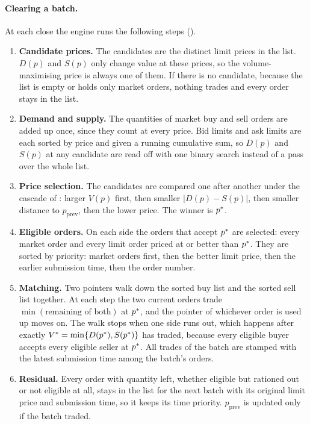 \paragraph{Clearing a batch.} At each close the engine runs the following
steps ().
\begin{enumerate}
  \item \textbf{Candidate prices.} The candidates are the distinct limit
  prices in the list. $D(p)$ and $S(p)$ only change value at these prices,
  so the volume-maximising price is always one of them. If there is no
  candidate, because the list is empty or holds only market orders, nothing
  trades and every order stays in the list.
  \item \textbf{Demand and supply.} The quantities of market buy and sell
  orders are added up once, since they count at every price. Bid limits and
  ask limits are each sorted by price and given a running cumulative sum,
  so $D(p)$ and $S(p)$ at any candidate are read off with one binary search
  instead of a pass over the whole list.
  \item \textbf{Price selection.} The candidates are compared one after
  another under the cascade of : larger $V(p)$ first,
  then smaller $|D(p) - S(p)|$, then smaller distance to $p_{\mathrm{prev}}$,
  then the lower price. The winner is $p^{\ast}$.
  \item \textbf{Eligible orders.} On each side the orders that accept
  $p^{\ast}$ are selected: every market order and every limit order priced at or
  better than $p^{\ast}$. They are sorted by priority: market orders first, then
  the better limit price, then the earlier submission time, then the order
  number.
  \item \textbf{Matching.} Two pointers walk down the sorted buy list and
  the sorted sell list together. At each step the two current orders trade
  $\min(\text{remaining of both})$ at $p^{\ast}$, and the pointer of whichever
  order is used up moves on. The walk stops when one side runs out, which
  happens after exactly $V^{*} = \min\{D(p^{\ast}), S(p^{\ast})\}$ has traded,
  because every eligible buyer accepts every eligible seller at $p^{\ast}$. All
  trades of the batch are stamped with the latest submission time among the
  batch's orders.
  \item \textbf{Residual.} Every order with quantity left, whether eligible
  but rationed out or not eligible at all, stays in the list for the next
  batch with its original limit price and submission time, so it keeps its
  time priority. $p_{\mathrm{prev}}$ is updated only if the batch traded.
\end{enumerate}

